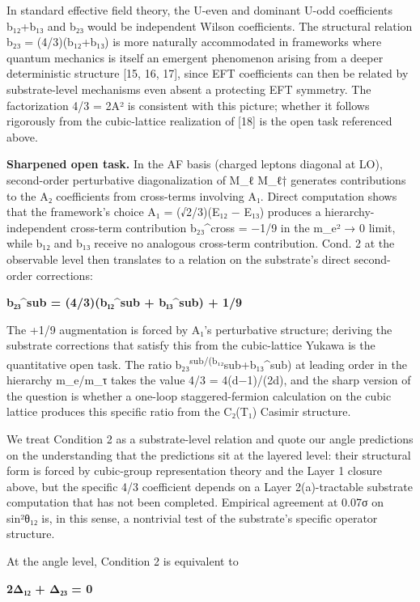 \documentclass[
  11pt,
  letterpaper,
]{article}
\begin{document}
In standard effective field theory, the U-even and dominant U-odd
coefficients b₁₂+b₁₃ and b₂₃ would be independent Wilson coefficients.
The structural relation b₂₃ = (4/3)(b₁₂+b₁₃) is more naturally
accommodated in frameworks where quantum mechanics is itself an emergent
phenomenon arising from a deeper deterministic structure {[}15, 16,
17{]}, since EFT coefficients can then be related by substrate-level
mechanisms even absent a protecting EFT symmetry. The factorization 4/3
= 2A² is consistent with this picture; whether it follows rigorously
from the cubic-lattice realization of {[}18{]} is the open task
referenced above.

\textbf{Sharpened open task.} In the AF basis (charged leptons diagonal
at LO), second-order perturbative diagonalization of M\_ℓ M\_ℓ†
generates contributions to the A₂ coefficients from cross-terms
involving A₁. Direct computation shows that the framework's choice A₁ =
(√2/3)(E₁₂ − E₁₃) produces a hierarchy-independent cross-term
contribution b₂₃\^{}cross = −1/9 in the m\_e² → 0 limit, while b₁₂ and
b₁₃ receive no analogous cross-term contribution. Cond. 2 at the
observable level then translates to a relation on the substrate's direct
second-order corrections:

\textbf{b₂₃\^{}sub = (4/3)(b₁₂\^{}sub + b₁₃\^{}sub) + 1/9}

The +1/9 augmentation is forced by A₁'s perturbative structure; deriving
the substrate corrections that satisfy this from the cubic-lattice
Yukawa is the quantitative open task. The ratio
b₂₃\textsuperscript{sub/(b₁₂}sub+b₁₃\^{}sub) at leading order in the
hierarchy m\_e/m\_τ takes the value 4/3 = 4(d−1)/(2d), and the sharp
version of the question is whether a one-loop staggered-fermion
calculation on the cubic lattice produces this specific ratio from the
C₂(T₁) Casimir structure.

We treat Condition 2 as a substrate-level relation and quote our angle
predictions on the understanding that the predictions sit at the layered
level: their structural form is forced by cubic-group representation
theory and the Layer 1 closure above, but the specific 4/3 coefficient
depends on a Layer 2(a)-tractable substrate computation that has not
been completed. Empirical agreement at 0.07σ on sin²θ₁₂ is, in this
sense, a nontrivial test of the substrate's specific operator structure.

At the angle level, Condition 2 is equivalent to

\textbf{2Δ₁₂ + Δ₂₃ = 0}
\end{document}
